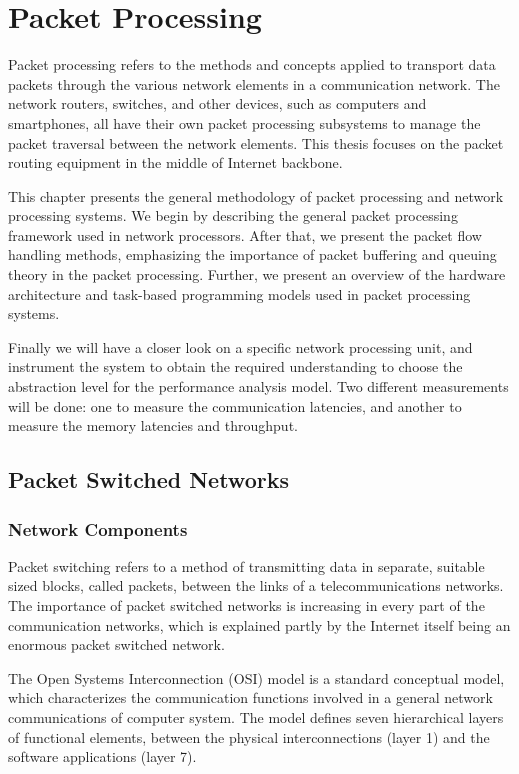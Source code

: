 \chapter{Packet Processing}
\label{chapter:packet-processing-systems}

Packet processing refers to the methods and concepts applied to transport data packets through the various network elements in a communication network. The network routers, switches, and other devices, such as computers and smartphones, all have their own packet processing subsystems to manage the packet traversal between the network elements. This thesis focuses on the packet routing equipment in the middle of Internet backbone.

This chapter presents the general methodology of packet processing and network processing systems. We begin by describing the general packet processing framework used in network processors. After that, we present the packet flow handling methods, emphasizing the importance of packet buffering and queuing theory in the packet processing. Further, we present an overview of the hardware architecture and task-based programming models used in packet processing systems.

Finally we will have a closer look on a specific network processing unit, and instrument the system to obtain the required understanding to choose the abstraction level for the performance analysis model. Two different measurements will be done: one to measure the communication latencies, and another to measure the memory latencies and throughput.

\section{Packet Switched Networks}
\subsection{Network Components}
Packet switching refers to a method of transmitting data in separate, suitable sized blocks, called packets, between the links of a telecommunications networks. The importance of packet switched networks is increasing in every part of the communication networks, which is explained partly by the Internet itself being an enormous packet switched network.

The Open Systems Interconnection (OSI) model is a standard conceptual model, which characterizes the communication functions involved in a general network communications of computer system. The model defines seven hierarchical layers of functional elements, between the physical interconnections (layer 1) and the software applications (layer 7).~\cite{ISO:1994:OSI}

